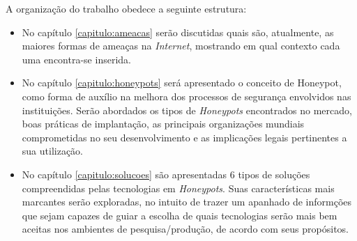 A organização do trabalho obedece a seguinte estrutura:

\begin{itemize}
    \item No capítulo \ref{capitulo:ameacas} serão discutidas quais são, atualmente, as maiores formas de ameaças na \textit{Internet}, mostrando em qual contexto cada uma encontra-se inserida.
    \item No capítulo \ref{capitulo:honeypots} será apresentado o conceito de Honeypot, como forma de auxílio na melhora dos processos de segurança envolvidos nas instituições. Serão abordados os tipos de \textit{Honeypots} encontrados no mercado, boas práticas de implantação, as principais organizações mundiais comprometidas no seu desenvolvimento e as implicações legais pertinentes a sua utilização.
    \item No capítulo \ref{capitulo:solucoes} são apresentadas 6 tipos de soluções compreendidas pelas tecnologias em \textit{Honeypots}. Suas características mais marcantes serão exploradas, no intuito de trazer um apanhado de informções que sejam capazes de guiar a escolha de quais tecnologias serão mais bem aceitas nos ambientes de pesquisa/produção, de acordo com seus propósitos.
\end{itemize}
